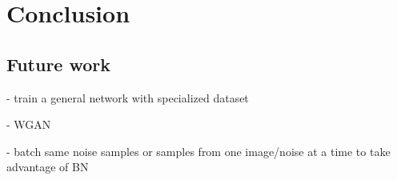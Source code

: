 \chapter{Conclusion}
\section{Future work}

- train a general network with specialized dataset

- WGAN

- batch same noise samples or samples from one image/noise at a time to take advantage of BN
